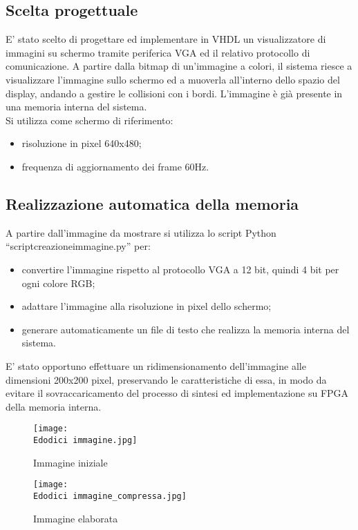 \documentclass[12pt]{article}
\def \Edodici {Allegati/Esercizio12/}
\begin{document}
{\subsection{Scelta progettuale}
E’ stato scelto di progettare ed implementare in VHDL un visualizzatore di immagini su schermo tramite periferica VGA ed il relativo protocollo di comunicazione. A partire dalla bitmap di un’immagine a colori, il sistema riesce a visualizzare l’immagine sullo schermo ed a muoverla all’interno dello spazio del display, andando a gestire le collisioni con i bordi. L’immagine è già presente in una memoria interna del sistema.
\\Si utilizza come schermo di riferimento:
\begin{itemize}
    \item risoluzione in pixel 640x480;
    \item frequenza di aggiornamento dei frame 60Hz.
\end{itemize}
\subsection{Realizzazione automatica della memoria}
A partire dall’immagine da mostrare si utilizza lo script Python “scriptcreazioneimmagine.py” per:
\begin{itemize}
    \item convertire l’immagine rispetto al protocollo VGA a 12 bit, quindi 4 bit per ogni colore RGB;
    \item adattare l’immagine alla risoluzione in pixel dello schermo;
    \item generare automaticamente un file di testo che realizza la memoria interna del sistema.
\end{itemize}
E’ stato opportuno effettuare un ridimensionamento dell’immagine alle dimensioni 200x200 pixel, preservando le caratteristiche di essa, in modo da evitare il sovraccaricamento  del processo di sintesi ed implementazione su FPGA della memoria interna.
\begin{figure}[ht!]
    \centering
    \texttt{[image: \\Edodici immagine.jpg]}
    \caption{Immagine iniziale}
\end{figure}
\begin{figure}[ht!]
    \centering
    \texttt{[image: \\Edodici immagine\_compressa.jpg]}
    \caption{Immagine elaborata}
\end{figure}
}
\end{document}
